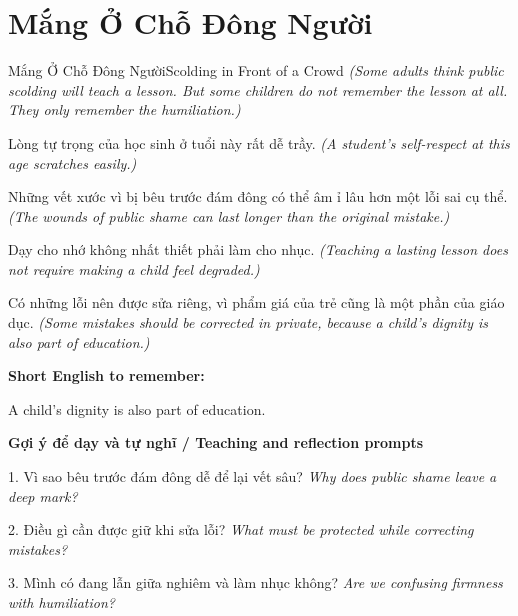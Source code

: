 \section{Mắng Ở Chỗ Đông Người}
\begin{truyen}{Mắng Ở Chỗ Đông Người}{Scolding in Front of a Crowd}
\textit{(Some adults think public scolding will teach a lesson. But some children do not remember the lesson at all. They only remember the humiliation.)}

Lòng tự trọng của học sinh ở tuổi này rất dễ trầy.
\textit{(A student’s self-respect at this age scratches easily.)}

Những vết xước vì bị bêu trước đám đông có thể âm ỉ lâu hơn một lỗi sai cụ thể.
\textit{(The wounds of public shame can last longer than the original mistake.)}

Dạy cho nhớ không nhất thiết phải làm cho nhục.
\textit{(Teaching a lasting lesson does not require making a child feel degraded.)}

\end{truyen}

\begin{baihoc}
Có những lỗi nên được sửa riêng, vì phẩm giá của trẻ cũng là một phần của giáo dục.
\textit{(Some mistakes should be corrected in private, because a child’s dignity is also part of education.)}
\end{baihoc}

\begin{ghinhoanh}
\textbf{Short English to remember:}

A child’s dignity is also part of education.

\end{ghinhoanh}

\begin{tuhocnhanh}
\textbf{Gợi ý để dạy và tự nghĩ / Teaching and reflection prompts}

1. Vì sao bêu trước đám đông dễ để lại vết sâu? \textit{Why does public shame leave a deep mark?}

2. Điều gì cần được giữ khi sửa lỗi? \textit{What must be protected while correcting mistakes?}

3. Mình có đang lẫn giữa nghiêm và làm nhục không? \textit{Are we confusing firmness with humiliation?}
\end{tuhocnhanh}
\ngancach

